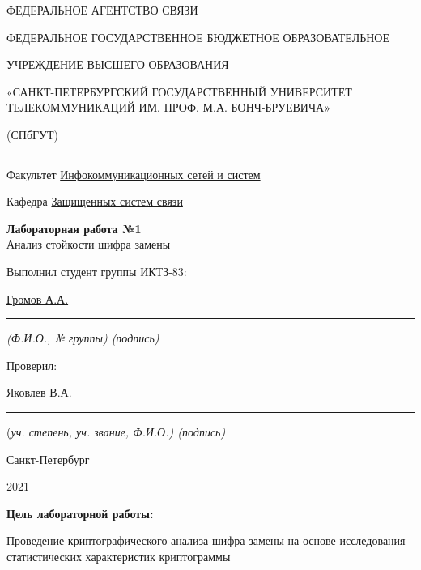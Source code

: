 \documentclass[a4paper,14pt]{extarticle}
\begin{document}
    \begin{center}
        \thispagestyle{empty}
        \begin{singlespace}
        ФЕДЕРАЛЬНОЕ АГЕНТСТВО СВЯЗИ

        ФЕДЕРАЛЬНОЕ ГОСУДАРСТВЕННОЕ БЮДЖЕТНОЕ ОБРАЗОВАТЕЛЬНОЕ

        УЧРЕЖДЕНИЕ ВЫСШЕГО ОБРАЗОВАНИЯ

        «САНКТ-ПЕТЕРБУРГСКИЙ ГОСУДАРСТВЕННЫЙ УНИВЕРСИТЕТ ТЕЛЕКОММУНИКАЦИЙ ИМ. ПРОФ. М.А. БОНЧ-БРУЕВИЧА»

        (СПбГУТ)
        \end{singlespace}
        \vspace{-1ex}
        \rule{\textwidth}{0.4pt}
        \vspace{-5ex}

        Факультет \underline{Инфокоммуникационных сетей и систем}

        Кафедра \underline{Защищенных систем связи}
        \vspace{10ex}

        \textbf{Лабораторная работа №1}\\
        Анализ стойкости шифра замены


    \end{center}
    \vspace{4ex}
    \begin{flushright}
    \parbox{10 cm}{
    \begin{flushleft}
        Выполнил студент группы ИКТЗ-83:

        \underline{Громов А.А. } \hfill \rule[-0.85ex]{0.1\textwidth}{0.6pt}

        \footnotesize \textit{ (Ф.И.О., № группы) \hfill (подпись)} \normalsize

        Проверил:

        \underline{Яковлев В.А.} \hfill \rule[-0.85ex]{0.1\textwidth}{0.6pt}

        (\footnotesize \textit{уч. степень, уч. звание, Ф.И.О.) \hfill (подпись)} \normalsize

    \end{flushleft}
    }
    \end{flushright}
    \begin{center}
        \vfill
        Санкт-Петербург

        2021

    \end{center}
    \newpage

    \textbf{Цель лабораторной работы:} \par
    Проведение криптографического анализа шифра замены на основе исследования статистических характеристик криптограммы
\end{document}
